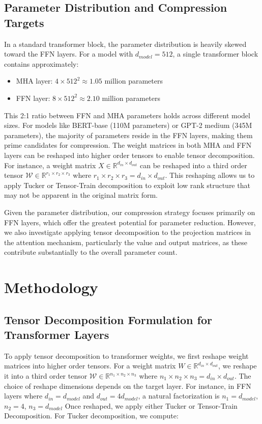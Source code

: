 \documentclass[conference]{IEEEtran}
\begin{document}
\subsection{Parameter Distribution and Compression Targets}
In a standard transformer block, the parameter distribution is heavily skewed toward the FFN layers. For a model with $d_{model} = 512$,
a single transformer block contains approximately:
\begin{itemize}
    \item MHA layer: $4 \times 512^2 \approx 1.05$ million parameters
    \item FFN layer: $8 \times 512^2 \approx 2.10$ million parameters
\end{itemize}
This 2:1 ratio between FFN and MHA parameters holds across different model sizes. For models like BERT-base (110M parameters) or
GPT-2 medium (345M parameters), the majority of parameters reside in the FFN layers, making them prime candidates for compression. 
The weight matrices in both MHA and FFN layers can be reshaped into higher order tensors to enable tensor decomposition.
For instance, a weight matrix $X \in \mathbb{R}^{d_{in} \times {d_{out}}}$ can be reshaped into a third order tensor
$\mathcal{W} \in \mathbb{R}^{r_1 \times r_2 \times r_3}$ where $r_1 \times r_2 \times r_3 = d_{in} \times d_{out}$. This reshaping
allows us to apply Tucker or Tensor-Train decomposition to exploit low rank structure that may not be apparent in the original matrix
form.

Given the parameter distribution, our compression strategy focuses primarily on FFN layers, which offer the greatest potential for
parameter reduction. However, we also investigate applying tensor decomposition to the projection matrices in the attention mechanism,
particularly the value and output matrices, as these contribute substantially to the overall parameter count.


\section{Methodology}

\subsection{Tensor Decomposition Formulation for Transformer Layers}
To apply tensor decomposition to transformer weights, we first reshape weight matrices into higher order tensors. For a weight matrix
$W \in \mathbb{R}^{d_{in} \times d_{out}}$, we reshape it into a third order tensor $\mathcal{W} \in \mathbb{R}^{n_1 \times n_2 \times n_3}$
where $n_1 \times n_2 \times n_3 = d_{in} \times d_{out}$. The choice of reshape dimensions depends on the target layer. For instance,
in FFN layers where $d_{in} = d_{model}$ and $d_{out} = 4d_{model}$, a natural factorization is $n_1 = d_{model}$, $n_2 = 4$, $n_3 = d_{model}$
Once reshaped, we apply either Tucker or Tensor-Train Decomposition. For Tucker decomposition, we compute:
\end{document}
